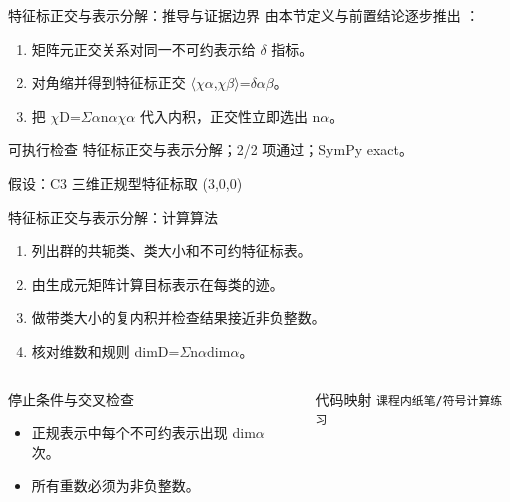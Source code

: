 \begin{frame}[t]{特征标正交与表示分解：推导与证据边界}
\footnotesize
{}\quad 由本节定义与前置结论逐步推出 ：
\begin{enumerate}
\item 矩阵元正交关系对同一不可约表示给 \ensuremath{\delta} 指标。
\item 对角缩并得到特征标正交 \ensuremath{\langle}\ensuremath{\chi}\ensuremath{\alpha},\ensuremath{\chi}\ensuremath{\beta}\ensuremath{\rangle}=\ensuremath{\delta}\ensuremath{\alpha}\ensuremath{\beta}。
\item 把 \ensuremath{\chi}D=\ensuremath{\Sigma}\ensuremath{\alpha}n\ensuremath{\alpha}\ensuremath{\chi}\ensuremath{\alpha} 代入内积，正交性立即选出 n\ensuremath{\alpha}。
\end{enumerate}\begin{block}{可执行检查}
\quad 特征标正交与表示分解；2/2 项通过；SymPy exact。
\par\scriptsize 假设：C3 三维正规型特征标取 (3,0,0)
\end{block}
\end{frame}

\begin{frame}[t]{特征标正交与表示分解：计算算法}
\footnotesize
{}\begin{enumerate}
\item 列出群的共轭类、类大小和不可约特征标表。
\item 由生成元矩阵计算目标表示在每类的迹。
\item 做带类大小的复内积并检查结果接近非负整数。
\item 核对维数和规则 dimD=\ensuremath{\Sigma}n\ensuremath{\alpha}dim\ensuremath{\alpha}。
\end{enumerate}\begin{columns}[T,onlytextwidth]
\begin{block}{停止条件与交叉检查}\scriptsize\begin{itemize}
\item[\CheckMark] 正规表示中每个不可约表示出现 dim\ensuremath{\alpha} 次。
\item[\CheckMark] 所有重数必须为非负整数。
\end{itemize}\end{block}
\begin{block}{代码映射}
\scriptsize \texttt{课程内纸笔/\allowbreak{}符号计算练习}
\end{block}\end{columns}\end{frame}

